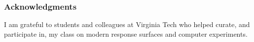 \documentclass[12pt]{article}
\begin{document}
\subsubsection*{Acknowledgments}

I am grateful to  students and colleagues at Virginia Tech who helped curate,
and participate in, my class on modern response surfaces and computer
experiments.



\end{document}
